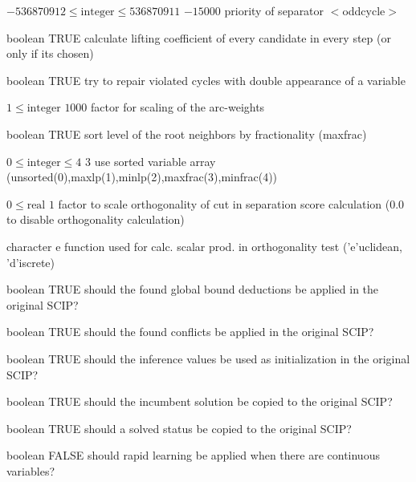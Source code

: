 %
{$-536870912\leq\textrm{integer}\leq536870911$}%
{$-15000$}%
{priority of separator $<$oddcycle$>$}%
{}

%
{boolean}%
{TRUE}%
{calculate lifting coefficient of every candidate in every step (or only if its chosen)}%
{}

%
{boolean}%
{TRUE}%
{try to repair violated cycles with double appearance of a variable}%
{}

%
{$1\leq\textrm{integer}$}%
{$1000$}%
{factor for scaling of the arc-weights}%
{}

%
{boolean}%
{TRUE}%
{sort level of the root neighbors by fractionality (maxfrac)}%
{}

%
{$0\leq\textrm{integer}\leq4$}%
{$3$}%
{use sorted variable array (unsorted(0),maxlp(1),minlp(2),maxfrac(3),minfrac(4))}%
{}

%
{$0\leq\textrm{real}$}%
{$1$}%
{factor to scale orthogonality of cut in separation score calculation (0.0 to disable orthogonality calculation)}%
{}

%
{character}%
{e}%
{function used for calc. scalar prod. in orthogonality test ('e'uclidean, 'd'iscrete)}%
{}

%
{boolean}%
{TRUE}%
{should the found global bound deductions be applied in the original SCIP?}%
{}

%
{boolean}%
{TRUE}%
{should the found conflicts be applied in the original SCIP?}%
{}

%
{boolean}%
{TRUE}%
{should the inference values be used as initialization in the original SCIP?}%
{}

%
{boolean}%
{TRUE}%
{should the incumbent solution be copied to the original SCIP?}%
{}

%
{boolean}%
{TRUE}%
{should a solved status be copied to the original SCIP?}%
{}

%
{boolean}%
{FALSE}%
{should rapid learning be applied when there are continuous variables?}%
{}

